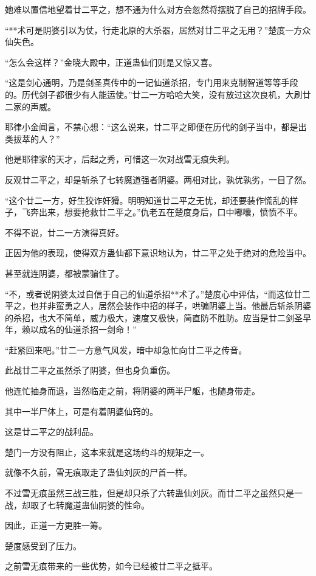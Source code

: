 \begin{this_body}
她难以置信地望着廿二平之，想不通为什么对方会忽然将摆脱了自己的招牌手段。

“**术可是阴婆引以为仗，行走北原的大杀器，居然对廿二平之无用？”楚度一方众仙失色。

“怎么会这样？”金晓大殿中，正道蛊仙们则是又惊又喜。

“这是剑心通明，乃是剑圣真传中的一记仙道杀招，专门用来克制智道等等手段的。历代剑子都很少有人能运使。”廿二一方哈哈大笑，没有放过这次良机，大刷廿二家的声威。

耶律小金闻言，不禁心想：“这么说来，廿二平之即便在历代的剑子当中，都是出类拔萃的人？”

他是耶律家的天才，后起之秀，可惜这一次对战雪无痕失利。

反观廿二平之，却是斩杀了七转魔道强者阴婆。两相对比，孰优孰劣，一目了然。

“这个廿二一方，好生狡诈奸猾。明明知道廿二平之无忧，却还要装作慌乱的样子，飞奔出来，想要抢救廿二平之。”仇老五在楚度身后，口中嘟囔，愤愤不平。

不得不说，廿二一方演得真好。

正因为他的表现，使得双方蛊仙都下意识地认为，廿二平之处于绝对的危险当中。

甚至就连阴婆，都被蒙骗住了。

“不，或者说阴婆太过自信于自己的仙道杀招**术了。”楚度心中评估，“而这位廿二平之，也并非蛮勇之人，居然会装作中招的样子，哄骗阴婆上当。他最后斩杀阴婆的杀招，也大不简单，威力极大，速度又极快，简直防不胜防。应当是廿二剑圣早年，赖以成名的仙道杀招一剑命！”

“赶紧回来吧。”廿二一方意气风发，暗中却急忙向廿二平之传音。

此战廿二平之虽然杀了阴婆，但也身负重伤。

他连忙抽身而退，当然临走之前，将阴婆的两半尸躯，也随身带走。

其中一半尸体上，可是有着阴婆仙窍的。

这是廿二平之的战利品。

楚门一方没有阻止，这本来就是这场约斗的规矩之一。

就像不久前，雪无痕取走了蛊仙刘灰的尸首一样。

不过雪无痕虽然三战三胜，但是却只杀了六转蛊仙刘灰。而廿二平之虽然只是一战，却取了七转魔道蛊仙阴婆的性命。

因此，正道一方更胜一筹。

楚度感受到了压力。

之前雪无痕带来的一些优势，如今已经被廿二平之抵平。


\end{this_body}
